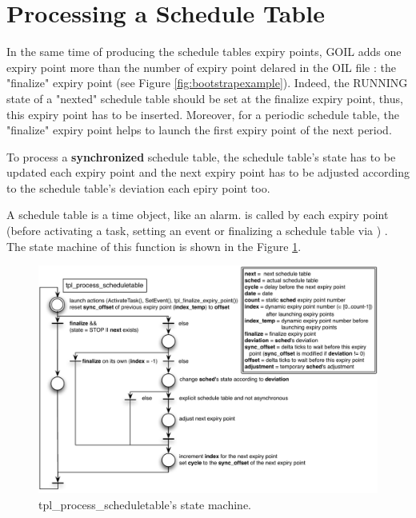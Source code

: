\section{Processing a Schedule Table}

In the same time of producing the schedule tables expiry points, GOIL adds one expiry point more than the number of expiry point delared in the OIL file : the "finalize" expiry point (see Figure \ref{fig:bootstrapexample}). Indeed, the RUNNING state of a "nexted" schedule table should be set at the finalize expiry point, thus, this expiry point has to be inserted. Moreover, for a periodic schedule table, the "finalize" expiry point helps to launch the first expiry point of the next period.

To process a \textbf{synchronized} schedule table, the schedule table's state has to be updated each expiry point and the next expiry point has to be adjusted according to the schedule table's deviation each epiry point too.

A schedule table is a time object, like an alarm.  is called by each expiry point (before activating a task, setting an event or finalizing a schedule table via ) . The state machine of this function is shown in the Figure \ref{fig:STprocessingTplProcess}.

\begin{figure}[H] %
   \centering
   \includegraphics[scale=0.6]{pictures/STprocessingTplProcess.pdf}  
   \caption{tpl_process_scheduletable's state machine.}
   \label{fig:STprocessingTplProcess}
\end{figure} 

